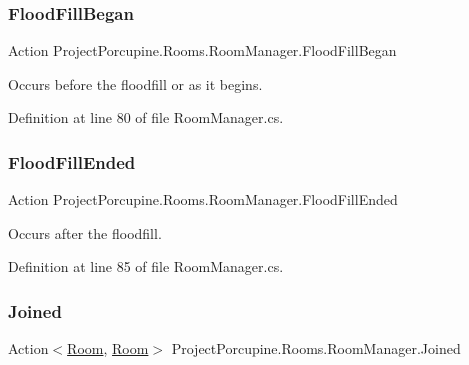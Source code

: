 \subsubsection{\texorpdfstring{Flood\+Fill\+Began}{FloodFillBegan}}
{\footnotesize\ttfamily Action Project\+Porcupine.\+Rooms.\+Room\+Manager.\+Flood\+Fill\+Began}



Occurs before the floodfill or \textquotesingle{}as it begins\textquotesingle{}. 



Definition at line 80 of file Room\+Manager.\+cs.

\mbox{\label{class_project_porcupine_1_1_rooms_1_1_room_manager_aeb63c8447353bd50a2d9608bfc0f6d52}} 
\subsubsection{\texorpdfstring{Flood\+Fill\+Ended}{FloodFillEnded}}
{\footnotesize\ttfamily Action Project\+Porcupine.\+Rooms.\+Room\+Manager.\+Flood\+Fill\+Ended}



Occurs after the floodfill. 



Definition at line 85 of file Room\+Manager.\+cs.

\mbox{\label{class_project_porcupine_1_1_rooms_1_1_room_manager_a68aa9c86e78c2f25228010994ab43567}} 
\subsubsection{\texorpdfstring{Joined}{Joined}}
{\footnotesize\ttfamily Action$<$\hyperlink{class_project_porcupine_1_1_rooms_1_1_room}{Room}, \hyperlink{class_project_porcupine_1_1_rooms_1_1_room}{Room}$>$ Project\+Porcupine.\+Rooms.\+Room\+Manager.\+Joined}



